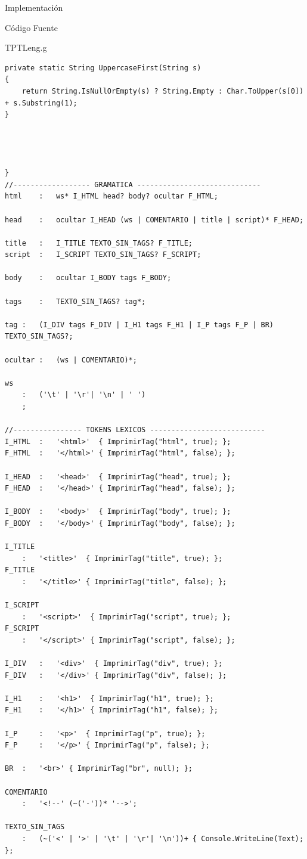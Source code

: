 \documentclass[a4paper,8pt]{article}
\begin{document}
\begin{section}{Implementación}
\begin{subsection}{Código Fuente}
\begin{subsubsection}{TPTLeng.g}
\begin{verbatim}
private static String UppercaseFirst(String s)
{
	return String.IsNullOrEmpty(s) ? String.Empty : Char.ToUpper(s[0]) + s.Substring(1);
}




}
//------------------ GRAMATICA -----------------------------
html 	:	ws* I_HTML head? body? ocultar F_HTML;

head 	:	ocultar I_HEAD (ws | COMENTARIO | title | script)* F_HEAD;

title 	:	I_TITLE TEXTO_SIN_TAGS? F_TITLE;
script 	:	I_SCRIPT TEXTO_SIN_TAGS? F_SCRIPT;

body 	:	ocultar I_BODY tags F_BODY;

tags	:	TEXTO_SIN_TAGS? tag*;

tag	:	(I_DIV tags F_DIV | I_H1 tags F_H1 | I_P tags F_P | BR) TEXTO_SIN_TAGS?;

ocultar	:	(ws | COMENTARIO)*;

ws 
    :   ('\t' | '\r'| '\n' | ' ')
    ;

//---------------- TOKENS LEXICOS ---------------------------
I_HTML 	:	'<html>'  { ImprimirTag("html", true); };
F_HTML 	:	'</html>' { ImprimirTag("html", false); };

I_HEAD 	:	'<head>'  { ImprimirTag("head", true); };
F_HEAD 	:	'</head>' { ImprimirTag("head", false); };

I_BODY 	:	'<body>'  { ImprimirTag("body", true); };
F_BODY 	:	'</body>' { ImprimirTag("body", false); };

I_TITLE
 	:	'<title>'  { ImprimirTag("title", true); };
F_TITLE 
	:	'</title>' { ImprimirTag("title", false); };
	
I_SCRIPT
 	:	'<script>'  { ImprimirTag("script", true); };
F_SCRIPT 
	:	'</script>' { ImprimirTag("script", false); };
	
I_DIV 	:	'<div>'  { ImprimirTag("div", true); };
F_DIV 	:	'</div>' { ImprimirTag("div", false); };
	
I_H1 	:	'<h1>'  { ImprimirTag("h1", true); };
F_H1 	:	'</h1>' { ImprimirTag("h1", false); };
	
I_P 	:	'<p>'  { ImprimirTag("p", true); };
F_P 	:	'</p>' { ImprimirTag("p", false); };

BR 	:	'<br>' { ImprimirTag("br", null); };

COMENTARIO 
	:	'<!--' (~('-'))* '-->';

TEXTO_SIN_TAGS 
	:	(~('<' | '>' | '\t' | '\r'| '\n'))+ { Console.WriteLine(Text); };

 \end{verbatim}

\end{subsubsection}

\end{subsection}
\end{section}
\end{document}
